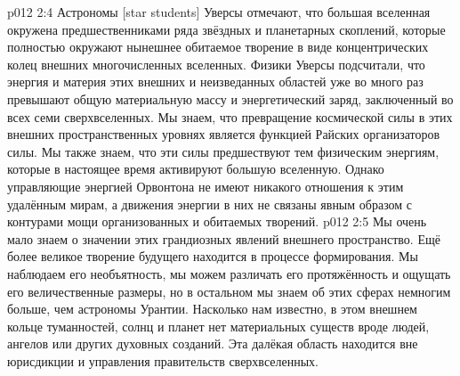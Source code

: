 \vs p012 2:4 \pc Астрономы [star students] Уверсы отмечают, что большая вселенная окружена предшественниками ряда звёздных и планетарных скоплений, которые полностью окружают нынешнее обитаемое творение в виде концентрических колец внешних многочисленных вселенных. Физики Уверсы подсчитали, что энергия и материя этих внешних и неизведанных областей уже во много раз превышают общую материальную массу и энергетический заряд, заключенный во всех семи сверхвселенных. Мы знаем, что превращение космической силы в этих внешних пространственных уровнях является функцией Райских организаторов силы. Мы также знаем, что эти силы предшествуют тем физическим энергиям, которые в настоящее время активируют большую вселенную. Однако управляющие энергией Орвонтона не имеют никакого отношения к этим удалённым мирам, а движения энергии в них не связаны явным образом с контурами мощи организованных и обитаемых творений.
\vs p012 2:5 \pc Мы очень мало знаем о значении этих грандиозных явлений внешнего пространство. Ещё более великое творение будущего находится в процессе формирования. Мы наблюдаем его необъятность, мы можем различать его протяжённость и ощущать его величественные размеры, но в остальном мы знаем об этих сферах немногим больше, чем астрономы Урантии. Насколько нам известно, в этом внешнем кольце туманностей, солнц и планет нет материальных существ вроде людей, ангелов или других духовных созданий. Эта далёкая область находится вне юрисдикции и управления правительств сверхвселенных.
